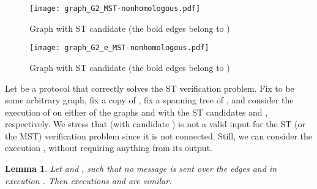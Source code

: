 \documentclass[11pt,letter]{article}
\newtheorem{lemma}[theorem]{Lemma}
\begin{document}
\begin{figure*}[htb]
\begin{center}
\begin{minipage}{\textwidth}
\centerline{\texttt{[image: graph\_G2\_MST-nonhomologous.pdf]}}
\end{minipage}
\caption[]{
\label{f:Graph_G2_MST}
\sf Graph  with ST candidate  (the bold edges belong to )}
\end{center}
\end{figure*}

\begin{figure*}[htb]
\begin{center}
\begin{minipage}{\textwidth}
\centerline{\texttt{[image: graph\_G2\_e\_MST-nonhomologous.pdf]}}
\end{minipage}
\caption[]{
\label{f:Graph_G2_e_MST}
\sf Graph  with ST candidate  (the bold edges belong to )}
\end{center}
\end{figure*}

Let  be a protocol that correctly solves the ST verification problem.
Fix  to be some arbitrary graph, fix a copy  of , 
fix a spanning tree  of , 
and consider  the execution of  on either of the graphs  and  
with the ST candidates  and , respectively. 
We stress  that  (with candidate ) is not a valid input for the ST 
(or the MST) verification problem since it is not connected. 
Still, we can consider the execution , 
without requiring anything from its output.

\begin{lemma} 
\label{lem_similarity} 
Let  and , such that no 
message is sent over the edges  and  in execution . 
Then executions  and  
are similar.
\end{lemma}
\end{document}
